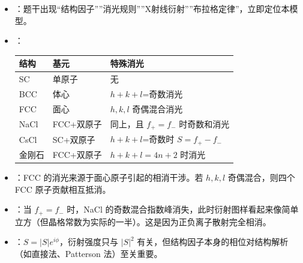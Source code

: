 \begin{tipbox}[快速识别与解题技巧]
\begin{itemize}
    \item {}：题干出现``结构因子''''消光规则''''X射线衍射''''布拉格定律''，立即定位本模型。
    \item {}：
    \begin{center}
    \begin{tabular}{lll}
    \toprule
    \textbf{结构} & \textbf{基元} & \textbf{特殊消光} \\
    \midrule
    SC & 单原子 & 无 \\
    BCC & 体心 & $h+k+l$=奇数消光 \\
    FCC & 面心 & $h,k,l$ 奇偶混合消光 \\
    NaCl & FCC+双原子 & 同上，且 $f_+=f_-$ 时奇数和消光 \\
    CsCl & SC+双原子 & $h+k+l$=奇数时 $S=f_+-f_-$ \\
    金刚石 & FCC+双原子 & $h+k+l=4n+2$ 时消光 \\
    \bottomrule
    \end{tabular}
    \end{center}
    \item {}：FCC 的消光来源于面心原子引起的相消干涉。若 $h,k,l$ 奇偶混合，则四个 FCC 原子贡献相互抵消。
    \item {}：当 $f_+=f_-$ 时，NaCl 的奇数混合指数峰消失，此时衍射图样看起来像简单立方（但晶格常数为实际的一半）。这是因为正负离子散射完全相消。
    \item {}：$S=|S|e^{i\phi}$，衍射强度只与 $|S|^2$ 有关，但结构因子本身的相位对结构解析（如直接法、Patterson 法）至关重要。
\end{itemize}
\end{tipbox}

